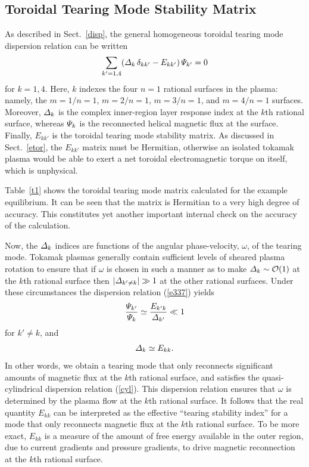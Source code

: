 \documentclass[12pt,prb,aps]{revtex4-1}
\begin{document}
\subsection{Toroidal Tearing Mode Stability Matrix}
 As described in Sect.~\ref{disp}, the general homogeneous toroidal tearing mode dispersion relation 
 can be written 
 \begin{equation}\label{e337}
\sum_{k'=1,4}({\mit\Delta}_k\,\delta_{kk'}-E_{kk'})\,{\mit\Psi}_{k'} = 0
\end{equation}
for $k=1,4$. 
Here, $k$ indexes the  four $n=1$ rational surfaces in the plasma: namely, the $m=1/n=1$, $m=2/n=1$, $m=3/n=1$, and $m=4/n=1$ surfaces.
Moreover, ${\mit\Delta}_k$ is the complex inner-region layer response
index at the $k$th rational surface,\cite{am1} whereas ${\mit\Psi}_k$ is the reconnected helical magnetic flux at the surface. Finally, $E_{kk'}$ is the toroidal
tearing mode stability matrix.\cite{cht,am1} As discussed in Sect.~\ref{etor}, the $E_{kk'}$ matrix must be Hermitian, otherwise an 
isolated tokamak plasma would be able to exert a net toroidal electromagnetic torque on itself, which is unphysical. 

 Table~\ref{t1} shows the toroidal tearing mode matrix calculated for the example equilibrium. It can be seen that the
matrix is Hermitian to a very high degree of accuracy. This constitutes yet another important internal check on the accuracy of the
calculation.

Now, the ${\mit\Delta}_k$ indices are functions of the angular phase-velocity, $\omega$,  of the tearing mode.\cite{am1,rfa} Tokamak plasmas
generally contain sufficient levels of sheared plasma rotation to ensure that if $\omega$ is chosen in such a manner as
to make ${\mit\Delta}_k\sim {\cal O}(1)$  
at the $k$th rational surface then $|{\mit\Delta}_{k'\neq k}|\gg 1$ at the other rational surfaces.\cite{am1,rfbook} Under these circumstances the dispersion
relation (\ref{e337}) yields
\begin{equation}
\frac{{\mit\Psi}_{k'}}{{\mit\Psi}_k}\simeq 
\frac{E_{k'k}}{{\mit\Delta}_{k'}} \ll 1
\end{equation}
for $k'\neq k$, and
\begin{equation}\label{cyl}
{\mit\Delta}_k \simeq E_{kk}.
\end{equation}
In other words, we obtain a tearing mode that only reconnects significant amounts of magnetic flux at the $k$th rational surface, and satisfies the
quasi-cylindrical dispersion relation (\ref{cyl}).\cite{fkr} This dispersion relation ensures that $\omega$ is determined by the plasma flow at the
$k$th rational surface.\cite{am1}
It follows that the real quantity $E_{kk}$ can be interpreted as
the  effective ``tearing stability index'' for a mode that only reconnects magnetic flux at the $k$th rational surface. To be more exact,
$E_{kk}$ is a measure of the amount of free energy available in the outer region, due to
current gradients and pressure gradients,\cite{mhde} to drive magnetic reconnection at the $k$th rational surface. 
\end{document}
